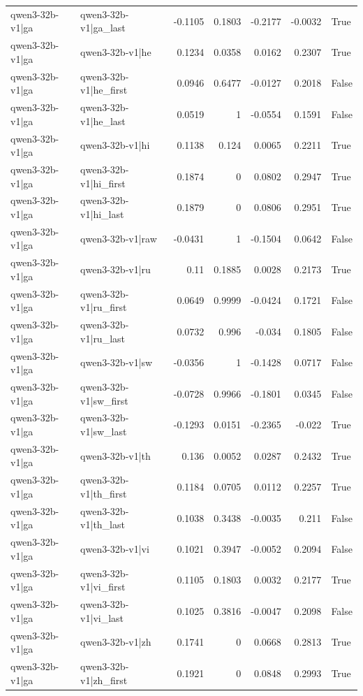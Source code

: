 \begin{table}
\begin{tabular}{l l r r r r l}
qwen3-32b-v1|ga & qwen3-32b-v1|ga_last & -0.1105 & 0.1803 & -0.2177 & -0.0032 & True \\
qwen3-32b-v1|ga & qwen3-32b-v1|he & 0.1234 & 0.0358 & 0.0162 & 0.2307 & True \\
qwen3-32b-v1|ga & qwen3-32b-v1|he_first & 0.0946 & 0.6477 & -0.0127 & 0.2018 & False \\
qwen3-32b-v1|ga & qwen3-32b-v1|he_last & 0.0519 & 1 & -0.0554 & 0.1591 & False \\
qwen3-32b-v1|ga & qwen3-32b-v1|hi & 0.1138 & 0.124 & 0.0065 & 0.2211 & True \\
qwen3-32b-v1|ga & qwen3-32b-v1|hi_first & 0.1874 & 0 & 0.0802 & 0.2947 & True \\
qwen3-32b-v1|ga & qwen3-32b-v1|hi_last & 0.1879 & 0 & 0.0806 & 0.2951 & True \\
qwen3-32b-v1|ga & qwen3-32b-v1|raw & -0.0431 & 1 & -0.1504 & 0.0642 & False \\
qwen3-32b-v1|ga & qwen3-32b-v1|ru & 0.11 & 0.1885 & 0.0028 & 0.2173 & True \\
qwen3-32b-v1|ga & qwen3-32b-v1|ru_first & 0.0649 & 0.9999 & -0.0424 & 0.1721 & False \\
qwen3-32b-v1|ga & qwen3-32b-v1|ru_last & 0.0732 & 0.996 & -0.034 & 0.1805 & False \\
qwen3-32b-v1|ga & qwen3-32b-v1|sw & -0.0356 & 1 & -0.1428 & 0.0717 & False \\
qwen3-32b-v1|ga & qwen3-32b-v1|sw_first & -0.0728 & 0.9966 & -0.1801 & 0.0345 & False \\
qwen3-32b-v1|ga & qwen3-32b-v1|sw_last & -0.1293 & 0.0151 & -0.2365 & -0.022 & True \\
qwen3-32b-v1|ga & qwen3-32b-v1|th & 0.136 & 0.0052 & 0.0287 & 0.2432 & True \\
qwen3-32b-v1|ga & qwen3-32b-v1|th_first & 0.1184 & 0.0705 & 0.0112 & 0.2257 & True \\
qwen3-32b-v1|ga & qwen3-32b-v1|th_last & 0.1038 & 0.3438 & -0.0035 & 0.211 & False \\
qwen3-32b-v1|ga & qwen3-32b-v1|vi & 0.1021 & 0.3947 & -0.0052 & 0.2094 & False \\
qwen3-32b-v1|ga & qwen3-32b-v1|vi_first & 0.1105 & 0.1803 & 0.0032 & 0.2177 & True \\
qwen3-32b-v1|ga & qwen3-32b-v1|vi_last & 0.1025 & 0.3816 & -0.0047 & 0.2098 & False \\
qwen3-32b-v1|ga & qwen3-32b-v1|zh & 0.1741 & 0 & 0.0668 & 0.2813 & True \\
qwen3-32b-v1|ga & qwen3-32b-v1|zh_first & 0.1921 & 0 & 0.0848 & 0.2993 & True \\

\end{tabular}
\end{table}

